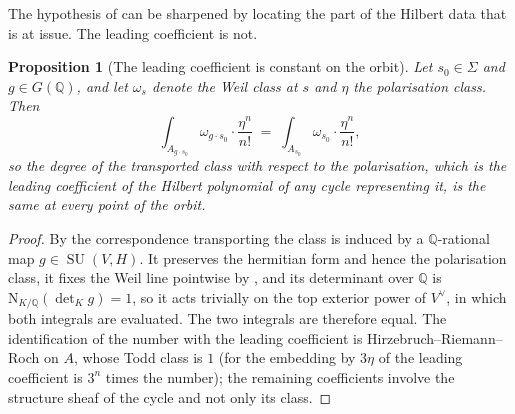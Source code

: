 \documentclass[11pt,reqno]{amsart}
\theoremstyle{plain}
\newtheorem{proposition}[theorem]{Proposition}
\theoremstyle{definition}
\theoremstyle{remark}
\newcommand{\QQ}{\mathbb{Q}}
\newcommand{\Nm}{\mathrm{N}}             %
\DeclareMathOperator{\SU}{SU}
\begin{document}
The hypothesis of  can be sharpened by locating the
part of the Hilbert data that is at issue. The leading coefficient is not.

\begin{proposition}[The leading coefficient is constant on the orbit]
\label{prop:leadingconstant}
Let $s_{0}\in\Sigma$ and $g\in G(\QQ)$, and let $\omega_{s}$ denote the Weil
class at $s$ and $\eta$ the polarisation class. Then
\[
  \int_{A_{g\cdot s_{0}}}\omega_{g\cdot s_{0}}\cdot\frac{\eta^{n}}{n!}
  \;=\;\int_{A_{s_{0}}}\omega_{s_{0}}\cdot\frac{\eta^{n}}{n!},
\]
so the degree of the transported class with respect to the polarisation, which
is the leading coefficient of the Hilbert polynomial of any cycle
representing it, is the same at every point of the orbit.
\end{proposition}

\begin{proof}
By  the correspondence transporting the class is induced
by a $\QQ$-rational map $g\in\SU(V,H)$. It preserves the hermitian form and
hence the polarisation class, it fixes the Weil line pointwise by
, and its determinant over $\QQ$ is
$\Nm_{K/\QQ}(\det_{K}g)=1$, so it acts trivially on the top exterior power of
$V^{\vee}$, in which both integrals are evaluated. The two integrals are
therefore equal. The identification of the number with the leading
coefficient is Hirzebruch--Riemann--Roch on $A$, whose Todd class is $1$ (for
the embedding by $3\eta$ of  the leading coefficient is
$3^{n}$ times the number); the remaining coefficients involve the structure
sheaf of the cycle and not only its class.
\end{proof}
\end{document}
